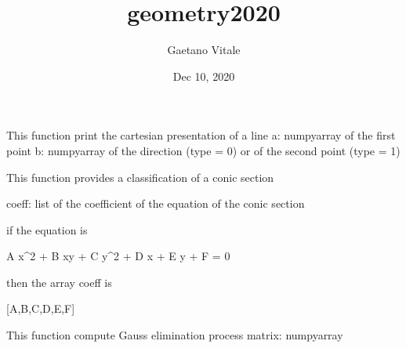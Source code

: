 \documentclass[letterpaper,10pt,english]{sphinxmanual}
\title{geometry2020}
\date{Dec 10, 2020}
\author{Gaetano Vitale}
\begin{document}
\pagestyle{empty}
\sphinxmaketitle
\pagestyle{plain}
\sphinxtableofcontents
\pagestyle{normal}
\label{\detokenize{index::doc}}

\label{\detokenize{index:module-main}}

\begin{fulllineitems}
\label{\detokenize{index:main.cartesian_representation_line}}
This function print the cartesian presentation of a line
a: numpy\sphinxhyphen{}array of the first point
b: numpy\sphinxhyphen{}array of the direction (type = 0) or of the second point (type = 1)

\end{fulllineitems}


\begin{fulllineitems}
\label{\detokenize{index:main.conic_section_classification}}
This function provides a classification of a conic section

coeff: list of the coefficient of the equation of the conic section

if the equation is

A x\textasciicircum{}2 + B xy + C y\textasciicircum{}2 + D x + E y + F = 0

then the array coeff is

{[}A,B,C,D,E,F{]}

\end{fulllineitems}


\begin{fulllineitems}
\label{\detokenize{index:main.gauss_elimination}}
This function compute  Gauss elimination process
matrix: numpy\sphinxhyphen{}array

\end{fulllineitems}
\end{document}

